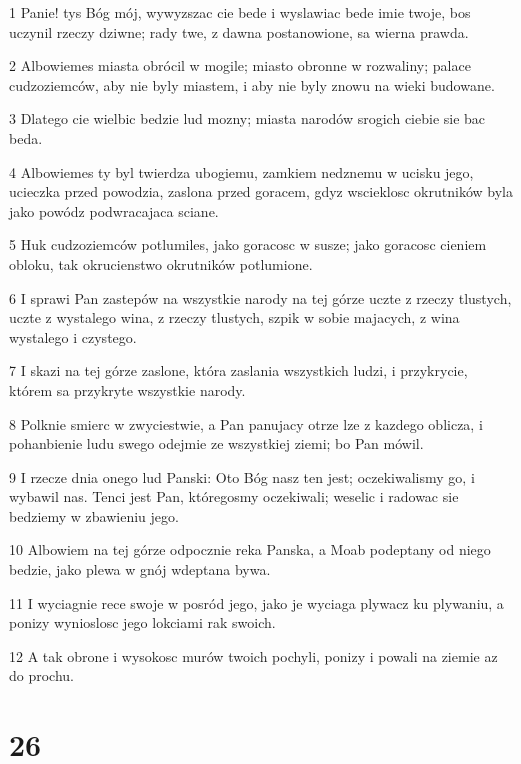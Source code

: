 \par 1 Panie! tys Bóg mój, wywyzszac cie bede i wyslawiac bede imie twoje, bos uczynil rzeczy dziwne; rady twe, z dawna postanowione, sa wierna prawda.
\par 2 Albowiemes miasta obrócil w mogile; miasto obronne w rozwaliny; palace cudzoziemców, aby nie byly miastem, i aby nie byly znowu na wieki budowane.
\par 3 Dlatego cie wielbic bedzie lud mozny; miasta narodów srogich ciebie sie bac beda.
\par 4 Albowiemes ty byl twierdza ubogiemu, zamkiem nedznemu w ucisku jego, ucieczka przed powodzia, zaslona przed goracem, gdyz wscieklosc okrutników byla jako powódz podwracajaca sciane.
\par 5 Huk cudzoziemców potlumiles, jako goracosc w susze; jako goracosc cieniem obloku, tak okrucienstwo okrutników potlumione.
\par 6 I sprawi Pan zastepów na wszystkie narody na tej górze uczte z rzeczy tlustych, uczte z wystalego wina, z rzeczy tlustych, szpik w sobie majacych, z wina wystalego i czystego.
\par 7 I skazi na tej górze zaslone, która zaslania wszystkich ludzi, i przykrycie, którem sa przykryte wszystkie narody.
\par 8 Polknie smierc w zwyciestwie, a Pan panujacy otrze lze z kazdego oblicza, i pohanbienie ludu swego odejmie ze wszystkiej ziemi; bo Pan mówil.
\par 9 I rzecze dnia onego lud Panski: Oto Bóg nasz ten jest; oczekiwalismy go, i wybawil nas. Tenci jest Pan, któregosmy oczekiwali; weselic i radowac sie bedziemy w zbawieniu jego.
\par 10 Albowiem na tej górze odpocznie reka Panska, a Moab podeptany od niego bedzie, jako plewa w gnój wdeptana bywa.
\par 11 I wyciagnie rece swoje w posród jego, jako je wyciaga plywacz ku plywaniu, a ponizy wynioslosc jego lokciami rak swoich.
\par 12 A tak obrone i wysokosc murów twoich pochyli, ponizy i powali na ziemie az do prochu.

\chapter{26}

